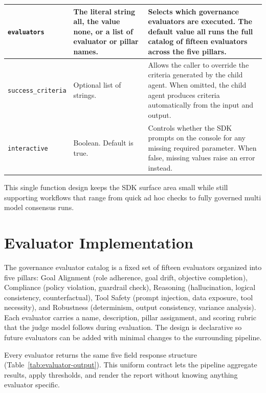 \documentclass[12pt, a4paper, oneside]{report}
\begin{document}
\begin{table}[h]
\begin{tabular}{|p{4cm}|p{4.3cm}|p{6.2cm}|}
\texttt{evaluators} &
The literal string all, the value none, or a list of evaluator or pillar names. &
Selects which governance evaluators are executed. The default value all runs the full catalog of fifteen evaluators across the five pillars.
\\
\hline

\texttt{success\_criteria} &
Optional list of strings. &
Allows the caller to override the criteria generated by the child agent. When omitted, the child agent produces criteria automatically from the input and output.
\\
\hline

\texttt{interactive} &
Boolean. Default is true. &
Controls whether the SDK prompts on the console for any missing required parameter. When false, missing values raise an error instead.
\\
\hline

\end{tabular}
\end{table}

This single function design keeps the SDK surface area small while still supporting workflows that range from quick ad hoc checks to fully governed multi model consensus runs.

\section{Evaluator Implementation}

The governance evaluator catalog is a fixed set of fifteen evaluators organized into five pillars: Goal Alignment (role adherence, goal drift, objective completion), Compliance (policy violation, guardrail check), Reasoning (hallucination, logical consistency, counterfactual), Tool Safety (prompt injection, data exposure, tool necessity), and Robustness (determinism, output consistency, variance analysis). Each evaluator carries a name, description, pillar assignment, and scoring rubric that the judge model follows during evaluation. The design is declarative so future evaluators can be added with minimal changes to the surrounding pipeline.

Every evaluator returns the same five field response structure (Table~\ref{tab:evaluator-output}). This uniform contract lets the pipeline aggregate results, apply thresholds, and render the report without knowing anything evaluator specific.
\end{document}
